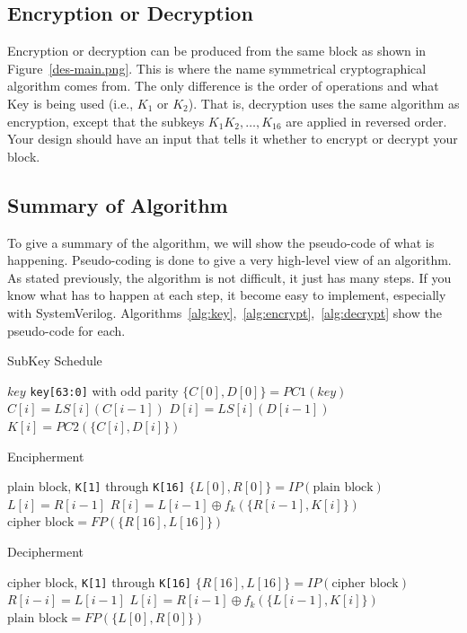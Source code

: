 \documentclass{article}
\begin{document}
\subsection{Encryption or Decryption}

Encryption or decryption can be produced from the same block as shown in
Figure~\ref{des-main.png}.  This is where the name symmetrical
cryptographical algorithm comes from.  The only difference is the
order of operations and what Key is being
used (i.e., $K_1$ or $K_2$).
That is, decryption uses the same algorithm as encryption, except that
the subkeys $K_1 K_2, \ldots, K_{16}$ are applied in reversed order.
Your design should have an input that tells it whether to
encrypt or decrypt your block.

\subsection{Summary of Algorithm}

To give a summary of the algorithm, we will show the pseudo-code of
what is happening.  Pseudo-coding is done to give a very high-level
view of an algorithm.  As stated previously, the algorithm is not
difficult, it just has many steps.  If you know what has to happen at
each step, it become easy to implement, especially with SystemVerilog.
Algorithms~\ref{alg:key},~\ref{alg:encrypt},~\ref{alg:decrypt} show
the pseudo-code for each.  
\begin{algorithm}
\caption{SubKey Schedule}\label{alg:key}
\begin{algorithmic}
\Require $key$
\Ensure \verb!key[63:0]! with odd parity
\State $\{C[0], D[0]\} = PC1(key)$
\State $C[i] = LS[i](C[i-1])$
\State $D[i] = LS[i](D[i-1])$
\State $K[i] = PC2(\{C[i], D[i]\})$
\EndFor
\end{algorithmic}
\end{algorithm}

\begin{algorithm}
\caption{Encipherment}\label{alg:encrypt}
\begin{algorithmic}
\Require plain block, \verb!K[1]! through \verb!K[16]!
\State $\{L[0], R[0]\} = IP(\text{plain block})$
\State $L[i] = R[i-1]$
\State $R[i] = L[i-1] \oplus f_k(\{R[i-1], K[i]\})$
\EndFor
\State $\text{cipher block} = FP(\{R[16], L[16]\})$
\end{algorithmic}
\end{algorithm}

\begin{algorithm}
\caption{Decipherment}\label{alg:decrypt}
\begin{algorithmic}
\Require cipher block, \verb!K[1]! through \verb!K[16]!
\State $\{R[16], L[16]\} = IP(\text{cipher block})$
\State $R[i-i] = L[i-1]$
\State $L[i] = R[i-1] \oplus f_k(\{L[i-1], K[i]\})$
\EndFor
\State $\text{plain block} = FP(\{L[0], R[0]\})$
\end{algorithmic}
\end{algorithm}
\end{document}
